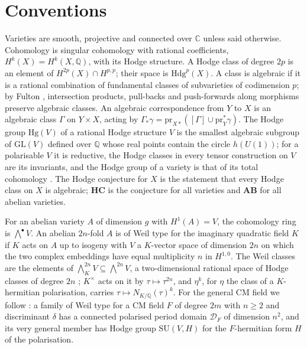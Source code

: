 \documentclass[11pt,reqno]{amsart}
\numberwithin{equation}{section}
\theoremstyle{plain}
\theoremstyle{definition}
\newcommand{\QQ}{\mathbb{Q}}
\newcommand{\CC}{\mathbb{C}}
\newcommand{\Hdg}{\mathrm{Hdg}}
\newcommand{\Hg}{\mathrm{Hg}}
\newcommand{\SU}{\mathrm{SU}}
\newcommand{\cD}{\mathcal{D}}
\newcommand{\HC}{\mathbf{HC}}
\newcommand{\AB}{\mathbf{AB}}
\begin{document}
\section{Conventions}\label{sec:conventions}

Varieties are smooth, projective and connected over $\CC$ unless said otherwise. Cohomology is singular cohomology with rational coefficients, $H^{k}(X)=H^{k}(X,\QQ)$, with its Hodge structure. A Hodge class of degree $2p$ is an element of $H^{2p}(X)\cap H^{p,p}$; their space is $\Hdg^{p}(X)$. A class is algebraic if it is a rational combination of fundamental classes of subvarieties of codimension $p$; by Fulton \cite{Ful98}, intersection products, pull-backs and push-forwards along morphisms preserve algebraic classes. An algebraic correspondence from $Y$ to $X$ is an algebraic class $\Gamma$ on $Y\times X$, acting by $\Gamma_{*}\gamma=\mathrm{pr}_{X*}([\Gamma]\cup\mathrm{pr}_{Y}^{*}\gamma)$. The Hodge group $\Hg(V)$ of a rational Hodge structure $V$ is the smallest algebraic subgroup of $\mathrm{GL}(V)$ defined over $\QQ$ whose real points contain the circle $h(U(1))$; for a polarisable $V$ it is reductive, the Hodge classes in every tensor construction on $V$ are its invariants, and the Hodge group of a variety is that of its total cohomology \cite{Del82}. The Hodge conjecture for $X$ is the statement that every Hodge class on $X$ is algebraic; $\HC$ is the conjecture for all varieties and $\AB$ for all abelian varieties.

For an abelian variety $A$ of dimension $g$ with $H^{1}(A)=V$, the cohomology ring is $\bigwedge^{\bullet}V$. An abelian $2n$-fold $A$ is of Weil type for the imaginary quadratic field $K$ if $K$ acts on $A$ up to isogeny with $V$ a $K$-vector space of dimension $2n$ on which the two complex embeddings have equal multiplicity $n$ in $H^{1,0}$. The Weil classes are the elements of $\bigwedge^{2n}_{K}V\subseteq\bigwedge^{2n}V$, a two-dimensional rational space of Hodge classes of degree $2n$ \cite{Weil77}; $K^{\times}$ acts on it by $\tau\mapsto\tau^{2n}$, and $\eta^{k}$, for $\eta$ the class of a $K$-hermitian polarisation, carries $\tau\mapsto N_{K/\QQ}(\tau)^{k}$. For the general CM field we follow \cite{BMB26}: a family of Weil type for a CM field $F$ of degree $2m$ with $n\ge2$ and discriminant $\delta$ has a connected polarised period domain $\cD_{F}$ of dimension $n^{2}$, and its very general member has Hodge group $\SU(V,H)$ for the $F$-hermitian form $H$ of the polarisation.
\end{document}
